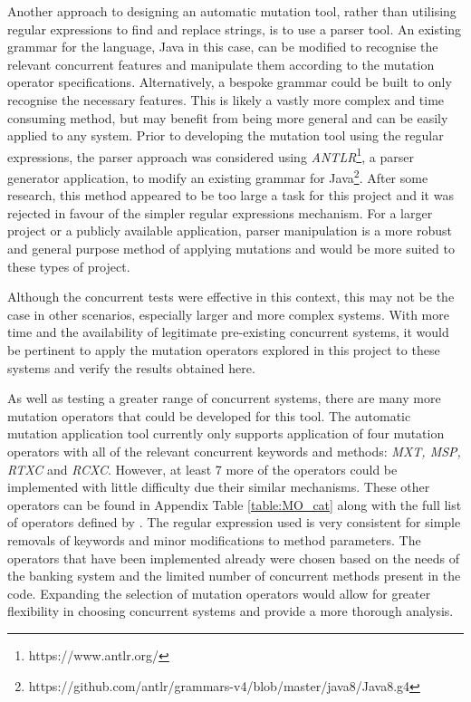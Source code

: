 \documentclass[a4paper,12pt]{article}
\begin{document}
Another approach to designing an automatic mutation tool, rather than utilising regular expressions to find and replace strings, is to use a parser tool. An existing grammar for the language, Java in this case, can be modified to recognise the relevant concurrent features and manipulate them according to the mutation operator specifications. Alternatively, a bespoke grammar could be built to only recognise the necessary features. This is likely a vastly more complex and time consuming method, but may benefit from being more general and can be easily applied to any system. Prior to developing the mutation tool using the regular expressions, the parser approach was considered using \textit{ANTLR}\footnote{https://www.antlr.org/}, a parser generator application, to modify an existing grammar for Java\footnote{https://github.com/antlr/grammars-v4/blob/master/java8/Java8.g4}. After some research, this method appeared to be too large a task for this project and it was rejected in favour of the simpler regular expressions mechanism. For a larger project or a publicly available application, parser manipulation is a more robust and general purpose method of applying mutations and would be more suited to these types of project.  

Although the concurrent tests were effective in this context, this may not be the case in other scenarios, especially larger and more complex systems. With more time and the availability of legitimate pre-existing concurrent systems, it would be pertinent to apply the mutation operators explored in this project to these systems and verify the results obtained here. 

As well as testing a greater range of concurrent systems, there are many more mutation operators that could be developed for this tool. The automatic mutation application tool currently only supports application of four mutation operators with all of the relevant concurrent keywords and methods: \textit{MXT, MSP, RTXC} and \textit{RCXC}. However, at least 7 more of the operators could be implemented with little difficulty due their similar mechanisms. These other operators can be found in Appendix Table \ref{table:MO_cat} along with the full list of operators defined by \citet{bradbury06}. The regular expression used is very consistent for simple removals of keywords and minor modifications to method parameters. The operators that have been implemented already were chosen based on the needs of the banking system and the limited number of concurrent methods present in the code. Expanding the selection of mutation operators would allow for greater flexibility in choosing concurrent systems and provide a more thorough analysis.      
    
\end{document}
